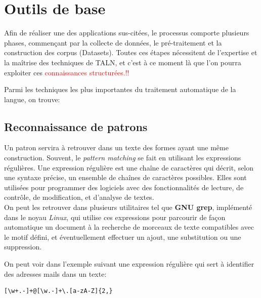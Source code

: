     
\section{Outils de base}
Afin de réaliser une des applications sus-citées, le processus comporte plusieurs phases, commençant par la collecte de données, le pré-traitement et la construction des corpus (Datasets). Toutes ces étapes nécessitent de l'expertise et la maîtrise des techniques de TALN, et c'est à ce moment là que l'on pourra exploiter ces \textcolor{red}{connaissances structurées.!!}

Parmi les techniques les plus importantes du traitement automatique de la langue, on trouve:
    \subsection{Reconnaissance de patrons}
    Un patron servira à retrouver dans un texte des formes ayant une même construction. Souvent, le \emph{pattern matching} se fait en utilisant les expressions régulières. Une expression régulière est une chaîne de caractères qui décrit, selon une syntaxe précise, un ensemble de chaînes de caractères possibles. Elles sont utilisées pour programmer des logiciels avec des fonctionnalités de lecture, de contrôle, de modification, et d'analyse de textes.\\
    On peut les retrouver dans plusieurs utilitaires tel que \textbf{GNU grep}, implémenté dans le noyau \emph{Linux}, qui utilise ces expressions pour parcourir de façon automatique un document à la recherche de morceaux de texte compatibles avec le motif défini, et éventuellement effectuer un ajout, une substitution ou une suppression.

    On peut voir dans l'exemple suivant une expression régulière qui sert à identifier des adresses mails dans un texte: 
    \begin{lstlisting}[style=code]
        [\w+.-]+@[\w.-]+\.[a-zA-Z]{2,}
    \end{lstlisting}

